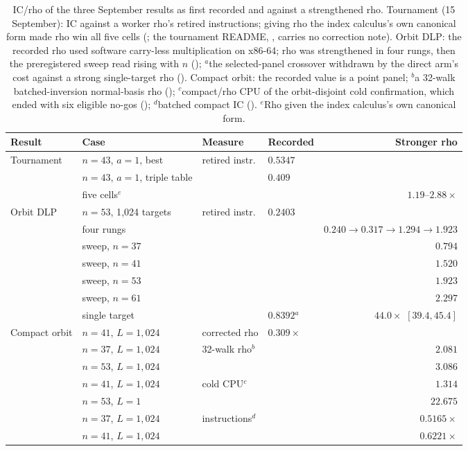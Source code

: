 \begin{table}[t]
\centering\small
\begin{tabular}{@{}llllr@{}}
\toprule
Result & Case & Measure & Recorded & Stronger rho \\
\midrule
Tournament & $n=43$, $a=1$, best & retired instr. & $0.5347$ & \\
 & $n=43$, $a=1$, triple table & & $0.409$ & \\
 & five cells$^{e}$ & & & $1.19$--$2.88\times$ \\
\addlinespace
Orbit DLP & $n=53$, 1{,}024 targets & retired instr. & $0.2403$ & \\
 & four rungs & & & $0.240\to0.317\to1.294\to1.923$ \\
 & sweep, $n=37$ & & & $0.794$ \\
 & sweep, $n=41$ & & & $1.520$ \\
 & sweep, $n=53$ & & & $1.923$ \\
 & sweep, $n=61$ & & & $2.297$ \\
 & single target & & $0.8392$$^{a}$ & $44.0\times$ $[39.4,45.4]$ \\
\addlinespace
Compact orbit & $n=41$, $L=1{,}024$ & corrected rho & $0.309\times$ & \\
 & $n=37$, $L=1{,}024$ & 32-walk rho$^{b}$ & & $2.081$ \\
 & $n=53$, $L=1{,}024$ & & & $3.086$ \\
 & $n=41$, $L=1{,}024$ & cold CPU$^{c}$ & & $1.314$ \\
 & $n=53$, $L=1$ & & & $22.675$ \\
 & $n=37$, $L=1{,}024$ & instructions$^{d}$ & & $0.5165\times$ \\
 & $n=41$, $L=1{,}024$ & & & $0.6221\times$ \\
\bottomrule
\end{tabular}
\caption[]{IC/rho of the three September results as first recorded and
against a strengthened rho. Tournament (15 September): IC against a worker
rho's retired instructions; giving rho the index calculus's own canonical
form made rho win all five cells
(; the tournament README,
, carries no correction
note). Orbit DLP: the recorded rho used software carry-less multiplication
on x86-64; rho was strengthened in four rungs, then the preregistered sweep
read rising with $n$
();
$^{a}$the selected-panel crossover withdrawn by the direct arm's cost
against a strong single-target rho
().
Compact orbit: the recorded value is a point panel;
$^{b}$a 32-walk batched-inversion normal-basis rho
();
$^{c}$compact/rho CPU of the orbit-disjoint cold confirmation, which ended
with six eligible no-gos
();
$^{d}$batched compact IC
().
$^{e}$Rho given the index calculus's own canonical form.}
\label{tab:prog_koblitz-reversals}
\end{table}

